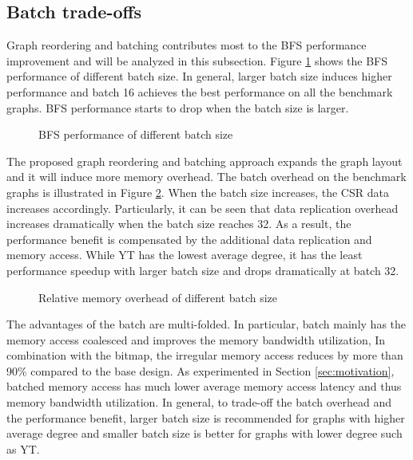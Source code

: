 \subsection{Batch trade-offs}
Graph reordering and batching contributes most to the BFS performance 
improvement and will be analyzed in this subsection. 
Figure \ref{fig:batch-perf} shows the BFS performance of different batch size.
In general, larger batch size induces higher performance and batch 16 
achieves the best performance on all the benchmark graphs. BFS performance 
starts to drop when the batch size is larger.  
\begin{figure}
    \caption{BFS performance of different batch size}
\label{fig:batch-perf}
\vspace{-1em}
\end{figure}


The proposed graph reordering and batching approach expands the 
graph layout and it will induce more memory overhead. The batch overhead 
on the benchmark graphs is illustrated in Figure \ref{fig:batch-overhead}. 
When the batch size increases, the CSR data increases accordingly. 
Particularly, it can be seen that data replication overhead 
increases dramatically when the batch size reaches 32. 
As a result, the performance benefit is compensated 
by the additional data replication and memory access.
While YT has the lowest average degree, it has the least performance 
speedup with larger batch size and drops dramatically at batch 32.

\begin{figure}
    \caption{Relative memory overhead of different batch size}
\label{fig:batch-overhead}
\vspace{-1em}
\end{figure}

The advantages of the batch are multi-folded.
In particular, batch mainly has the memory 
access coalesced and improves the memory bandwidth utilization, 
In combination with the bitmap, the irregular memory access 
reduces by more than 90\% compared to the base design.
As experimented in Section \ref{sec:motivation}, batched memory 
access has much lower average memory access latency and thus memory 
bandwidth utilization. In general, to trade-off the batch 
overhead and the performance benefit, 
larger batch size is recommended for graphs with higher average degree 
and smaller batch size is better for graphs with lower degree 
such as YT.  


